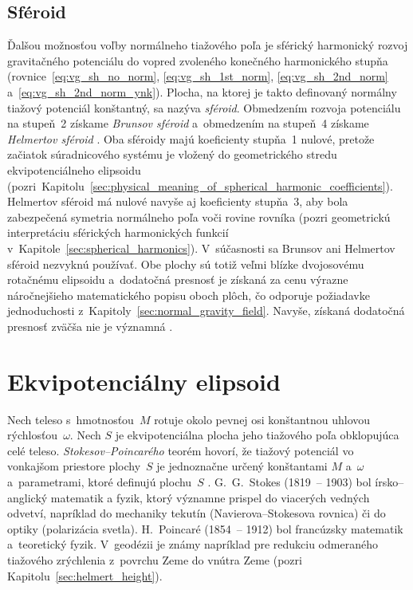 \documentclass[a4paper, 12pt]{book}
\begin{document}
\subsection{Sféroid}
\label{sec:normal_field_spheroid}

Ďalšou možnosťou voľby normálneho tiažového poľa je sférický harmonický rozvoj 
gravitačného potenciálu do vopred zvoleného konečného harmonického stupňa 
(rovnice~\ref{eq:vg_sh_no_norm}, \ref{eq:vg_sh_1st_norm}, 
\ref{eq:vg_sh_2nd_norm} a~\ref{eq:vg_sh_2nd_norm_ynk}).  Plocha, na ktorej je 
takto definovaný normálny tiažový potenciál konštantný, sa nazýva 
\emph{sféroid}.  Obmedzením rozvoja potenciálu na stupeň~2 získame 
\emph{Brunsov sféroid} a~obmedzením na stupeň~4 získame \emph{Helmertov 
sféroid} \parencite{Moritz1967}.  Oba sféroidy majú koeficienty stupňa~1 
nulové, pretože začiatok súradnicového systému je vložený do geometrického 
stredu ekvipotenciálneho elipsoidu 
(pozri~Kapitolu~\ref{sec:physical_meaning_of_spherical_harmonic_coefficients}).  
Helmertov sféroid má nulové navyše aj koeficienty stupňa~3, aby bola 
zabezpečená symetria normálneho poľa voči rovine rovníka (pozri geometrickú 
interpretáciu sférických harmonických funkcií 
v~Kapitole~\ref{sec:spherical_harmonics}).   V~súčasnosti sa Brunsov ani 
Helmertov sféroid nezvyknú používať.  Obe plochy sú totiž veľmi blízke 
dvojosovému rotačnému elipsoidu a~dodatočná presnosť je získaná za cenu výrazne 
náročnejšieho matematického popisu oboch plôch, čo odporuje požiadavke 
jednoduchosti z~Kapitoly~\ref{sec:normal_gravity_field}.  Navyše, získaná 
dodatočná presnosť zväčša nie je významná \parencite{Moritz1967}.



\section{Ekvipotenciálny elipsoid}
\label{sec:equipotential_ellipsoid}

Nech teleso s~hmotnosťou~$M$ rotuje okolo pevnej osi konštantnou uhlovou 
rýchlosťou~$\omega$.  Nech $S$ je ekvipotenciálna plocha jeho tiažového poľa 
obklopujúca celé teleso.  \emph{Stokesov--Poincarého} teorém hovorí, že tiažový 
potenciál vo vonkajšom priestore plochy~$S$ je jednoznačne určený konštantami 
$M$ a~$\omega$ a~parametrami, ktoré definujú plochu~$S$ 
\parencite{TorgeGeodesy}.  G.~G.~Stokes (1819~-- 1903) bol írsko--anglický 
matematik a fyzik, ktorý významne prispel do viacerých vedných odvetví, 
napríklad do mechaniky tekutín (Navierova--Stokesova rovnica) či do optiky 
(polarizácia svetla).  H.~Poincaré (1854~-- 1912) bol francúzsky matematik 
a~teoretický fyzik.  V~geodézii je známy napríklad pre redukciu odmeraného 
tiažového zrýchlenia z~povrchu Zeme do vnútra Zeme (pozri 
Kapitolu~\ref{sec:helmert_height}).
\end{document}
